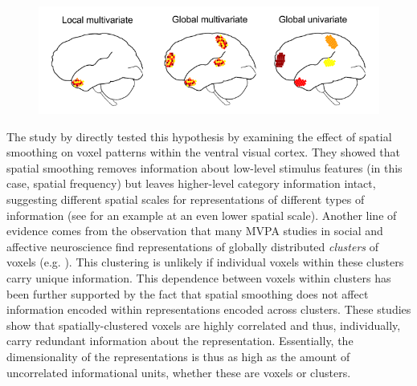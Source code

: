 \documentclass[jou,12pt,a4paper]{apa6}
\begin{document}
\begin{figure}[ht]
\centering
\includegraphics[scale=.55]{spatialDist2}
\end{figure}

The study by  directly tested this hypothesis by examining the effect of spatial smoothing on voxel patterns within the ventral visual cortex. They showed that spatial smoothing removes information about low-level stimulus features (in this case, spatial frequency) but leaves higher-level category information intact, suggesting different spatial scales for representations of different types of information (see  for an example at an even lower spatial scale). Another line of evidence comes from the observation that many MVPA studies in social and affective neuroscience find representations of globally distributed \emph{clusters} of voxels (e.g. ). This clustering is unlikely if individual voxels within these clusters carry unique information. This dependence between voxels within clusters has been further supported by the fact that spatial smoothing \cite{oosterwijk2015,kassam2013} does not affect information encoded within representations encoded across clusters. These studies show that spatially-clustered voxels are highly correlated and thus, individually, carry redundant information about the representation. Essentially, the dimensionality of the representations is thus as high as the amount of uncorrelated informational units, whether these are voxels or clusters.  
\end{document}
